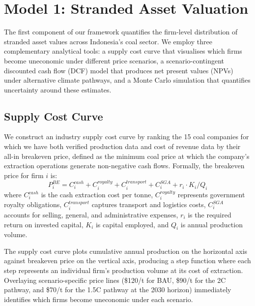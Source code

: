 
\section{Model 1: Stranded Asset Valuation}
\label{sec:model1}

The first component of our framework quantifies the firm-level distribution of stranded asset values across Indonesia's coal sector. We employ three complementary analytical tools: a supply cost curve that visualises which firms become uneconomic under different price scenarios, a scenario-contingent discounted cash flow (DCF) model that produces net present values (NPVs) under alternative climate pathways, and a Monte Carlo simulation that quantifies uncertainty around these estimates.

\subsection{Supply Cost Curve}
\label{subsec:supply_cost}

We construct an industry supply cost curve by ranking the 15 coal companies for which we have both verified production data and cost of revenue data by their all-in breakeven price, defined as the minimum coal price at which the company's extraction operations generate non-negative cash flows. Formally, the breakeven price for firm $i$ is:
\begin{equation}
\label{eq:breakeven}
P_i^{BE} = C_i^{cash} + C_i^{royalty} + C_i^{transport} + C_i^{SGA} + r_i \cdot K_i / Q_i
\end{equation}
where $C_i^{cash}$ is the cash extraction cost per tonne, $C_i^{royalty}$ represents government royalty obligations, $C_i^{transport}$ captures transport and logistics costs, $C_i^{SGA}$ accounts for selling, general, and administrative expenses, $r_i$ is the required return on invested capital, $K_i$ is capital employed, and $Q_i$ is annual production volume.

The supply cost curve plots cumulative annual production on the horizontal axis against breakeven price on the vertical axis, producing a step function where each step represents an individual firm's production volume at its cost of extraction. Overlaying scenario-specific price lines (\$120/t for BAU, \$90/t for the 2\textdegree C pathway, and \$70/t for the 1.5\textdegree C pathway at the 2030 horizon) immediately identifies which firms become uneconomic under each scenario.

